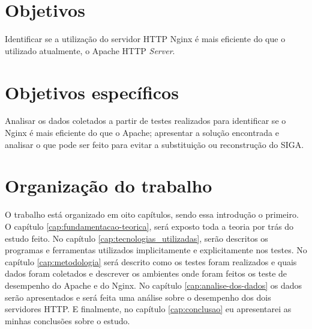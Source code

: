 \section{Objetivos}
Identificar se a utilização do servidor HTTP Nginx é mais eficiente do que o 
utilizado atualmente, o Apache HTTP \textit{Server}.\\
\section{Objetivos específicos}
Analisar os dados coletados a partir de testes realizados para identificar se o 
Nginx é mais eficiente do que o Apache; apresentar a solução encontrada e 
analisar o que pode ser feito para evitar a substituição ou reconstrução do 
SIGA.\\
\section{Organização do trabalho}
O trabalho está organizado em oito capítulos, sendo essa introdução o primeiro. 
O capítulo \ref{cap:fundamentacao-teorica}, será exposto toda a teoria por trás 
do estudo feito. No capítulo \ref{cap:tecnologias_utilizadas}, serão descritos 
os programas e ferramentas utilizados implicitamente e explicitamente nos 
testes. No capítulo \ref{cap:metodologia} será descrito como os testes foram 
realizados e quais dados foram coletados e descrever os ambientes onde foram 
feitos os teste de desempenho do Apache e do Nginx. No capítulo 
\ref{cap:analise-dos-dados} os dados serão apresentados e 
será feita uma análise sobre o desempenho dos dois servidores HTTP. E 
finalmente, no capítulo \ref{cap:conclusao} eu apresentarei as minhas 
conclusões sobre o estudo.\\
